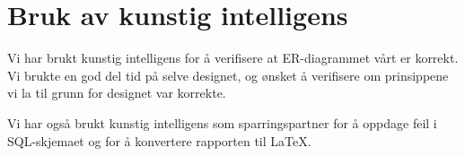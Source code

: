 \section{Bruk av kunstig intelligens}

Vi har brukt kunstig intelligens for å verifisere at ER-diagrammet vårt er korrekt. Vi brukte en god del tid på selve designet, og ønsket å verifisere om prinsippene vi la til grunn for designet var korrekte.

Vi har også brukt kunstig intelligens som sparringspartner for å oppdage feil i SQL-skjemaet og for å konvertere rapporten til LaTeX.

